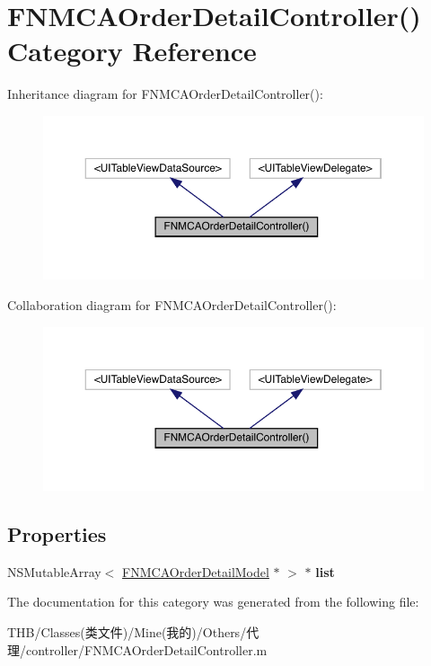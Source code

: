 \hypertarget{category_f_n_m_c_a_order_detail_controller_07_08}{}\section{F\+N\+M\+C\+A\+Order\+Detail\+Controller() Category Reference}
\label{category_f_n_m_c_a_order_detail_controller_07_08}


Inheritance diagram for F\+N\+M\+C\+A\+Order\+Detail\+Controller()\+:\nopagebreak
\begin{figure}[H]
\begin{center}
\leavevmode
\includegraphics[width=350pt]{category_f_n_m_c_a_order_detail_controller_07_08__inherit__graph}
\end{center}
\end{figure}


Collaboration diagram for F\+N\+M\+C\+A\+Order\+Detail\+Controller()\+:\nopagebreak
\begin{figure}[H]
\begin{center}
\leavevmode
\includegraphics[width=350pt]{category_f_n_m_c_a_order_detail_controller_07_08__coll__graph}
\end{center}
\end{figure}
\subsection*{Properties}
\begin{DoxyCompactItemize}
\item 
\mbox{\label{category_f_n_m_c_a_order_detail_controller_07_08_ae47d25d5e8b564d06638d7f4cac102a4}} 
N\+S\+Mutable\+Array$<$ \mbox{\hyperlink{interface_f_n_m_c_a_order_detail_model}{F\+N\+M\+C\+A\+Order\+Detail\+Model}} $\ast$ $>$ $\ast$ {\bfseries list}
\end{DoxyCompactItemize}


The documentation for this category was generated from the following file\+:\begin{DoxyCompactItemize}
\item 
T\+H\+B/\+Classes(类文件)/\+Mine(我的)/\+Others/代理/controller/F\+N\+M\+C\+A\+Order\+Detail\+Controller.\+m\end{DoxyCompactItemize}
